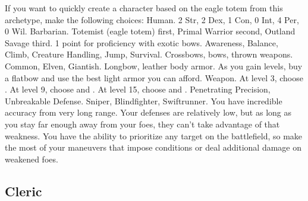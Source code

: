             If you want to quickly create a character based on the eagle totem from this archetype, make the following choices:
             Human.
             2 Str, 2 Dex, 1 Con, 0 Int, 4 Per, 0 Wil.
             Barbarian.
             Totemist (eagle totem) first, Primal Warrior second, Outland Savage third.
             1 point for proficiency with exotic bows.
             Awareness, Balance, Climb, Creature Handling, Jump, Survival.
             Crossbows, bows, thrown weapons.
             Common, Elven, Giantish.
             Longbow, leather body armor. As you gain levels, buy a flatbow and use the best light armor you can afford.
             Weapon.
                At level 3, choose .
                At level 9, choose  and .
                At level 15, choose  and .
             Penetrating Precision, Unbreakable Defense.
             Sniper, Blindfighter, Swiftrunner.
             You have incredible accuracy from very long range.
            Your defenses are relatively low, but as long as you stay far enough away from your foes, they can't take advantage of that weakness.
            You have the ability to prioritize any target on the battlefield, so make the most of your maneuvers that impose conditions or deal additional damage on weakened foes.

    \subsection{Cleric}

